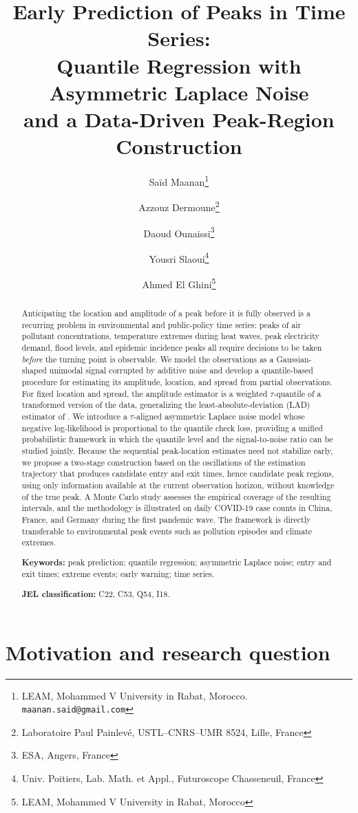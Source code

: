 \documentclass[11pt,a4paper]{article}
\title{\textbf{Early Prediction of Peaks in Time Series:\\
Quantile Regression with Asymmetric Laplace Noise\\
and a Data-Driven Peak-Region Construction}}
\author{Sa\"{i}d Maanan\thanks{LEAM, Mohammed V University in Rabat, Morocco. \texttt{maanan.said@gmail.com}} \and
Azzouz Dermoune\thanks{Laboratoire Paul Painlev\'e, USTL--CNRS--UMR 8524, Lille, France} \and
Daoud Ounaissi\thanks{ESA, Angers, France} \and
Yousri Slaoui\thanks{Univ. Poitiers, Lab. Math. et Appl., Futuroscope Chasseneuil, France} \and
Ahmed El Ghini\thanks{LEAM, Mohammed V University in Rabat, Morocco}}
\date{}
\begin{document}
\maketitle

\begin{abstract}
\noindent
Anticipating the location and amplitude of a peak before it is fully observed
is a recurring problem in environmental and public-policy time series: peaks
of air pollutant concentrations, temperature extremes during heat waves, peak
electricity demand, flood levels, and epidemic incidence peaks all require
decisions to be taken \emph{before} the turning point is observable. We model
the observations as a Gaussian-shaped unimodal signal corrupted by additive
noise and develop a quantile-based procedure for estimating its amplitude,
location, and spread from partial observations. For fixed location and spread,
the amplitude estimator is a weighted $\tau$-quantile of a transformed version
of the data, generalizing the least-absolute-deviation (LAD) estimator of
\citet{Dermoune}. We introduce a $\tau$-aligned asymmetric Laplace noise model
whose negative log-likelihood is proportional to the quantile check loss,
providing a unified probabilistic framework in which the quantile level and
the signal-to-noise ratio can be studied jointly. Because the sequential
peak-location estimates need not stabilize early, we propose a two-stage
construction based on the oscillations of the estimation trajectory that
produces candidate entry and exit times, hence candidate peak regions,
using only information available at the current observation horizon, without
knowledge of the true peak. A Monte Carlo study assesses the empirical
coverage of the resulting intervals, and the methodology is illustrated on
daily COVID-19 case counts in China, France, and Germany during the first
pandemic wave. The framework is directly transferable to environmental peak
events such as pollution episodes and climate extremes.

\medskip
\noindent\textbf{Keywords:} peak prediction; quantile regression; asymmetric
Laplace noise; entry and exit times; extreme events; early warning; time
series.

\medskip
\noindent\textbf{JEL classification:} C22, C53, Q54, I18.
\end{abstract}

\section{Motivation and research question}
\label{sec:motivation}
\end{document}
